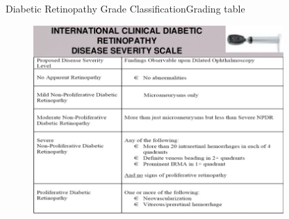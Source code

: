 \documentclass{beamer}
\begin{document}
\begin{frame}{Diabetic Retinopathy Grade Classification}{Grading table}
\begin{figure}[p]
	\centering
	\includegraphics[width=0.85\textwidth]{diabetic-retinopathy-grading-table.jpg}
\end{figure}
\end{frame}


\end{document}
